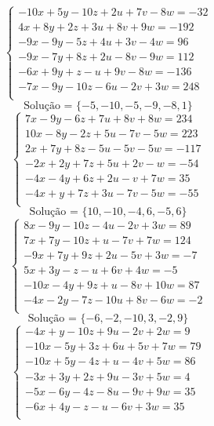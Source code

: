 \documentclass[12pt,oneside,a4paper]{article}
\begin{document}
\vspace{\baselineskip}
\begin{equation*}
\begin{cases}
-10x+5y-10z+2u+7v-8w=-32 \\
4x+8y+2z+3u+8v+9w=-192 \\
-9x-9y-5z+4u+3v-4w=96 \\
-9x-7y+8z+2u-8v-9w=112 \\
-6x+9y+z-u+9v-8w=-136 \\
-7x-9y-10z-6u-2v+3w=248 \\
\end{cases}
\end{equation*}
\begin{equation*}
\text{Solução = }\{-5,-10,-5,-9,-8,1\}
\end{equation*}
\vspace{\baselineskip}
\begin{equation*}
\begin{cases}
7x-9y-6z+7u+8v+8w=234 \\
10x-8y-2z+5u-7v-5w=223 \\
2x+7y+8z-5u-5v-5w=-117 \\
-2x+2y+7z+5u+2v-w=-54 \\
-4x-4y+6z+2u-v+7w=35 \\
-4x+y+7z+3u-7v-5w=-55 \\
\end{cases}
\end{equation*}
\begin{equation*}
\text{Solução = }\{10,-10,-4,6,-5,6\}
\end{equation*}
\vspace{\baselineskip}
\begin{equation*}
\begin{cases}
8x-9y-10z-4u-2v+3w=89 \\
7x+7y-10z+u-7v+7w=124 \\
-9x+7y+9z+2u-5v+3w=-7 \\
5x+3y-z-u+6v+4w=-5 \\
-10x-4y+9z+u-8v+10w=87 \\
-4x-2y-7z-10u+8v-6w=-2 \\
\end{cases}
\end{equation*}
\begin{equation*}
\text{Solução = }\{-6,-2,-10,3,-2,9\}
\end{equation*}
\vspace{\baselineskip}
\begin{equation*}
\begin{cases}
-4x+y-10z+9u-2v+2w=9 \\
-10x-5y+3z+6u+5v+7w=79 \\
-10x+5y-4z+u-4v+5w=86 \\
-3x+3y+2z+9u-3v+5w=4 \\
-5x-6y-4z-8u-9v+9w=35 \\
-6x+4y-z-u-6v+3w=35 \\
\end{cases}
\end{equation*}
\end{document}
